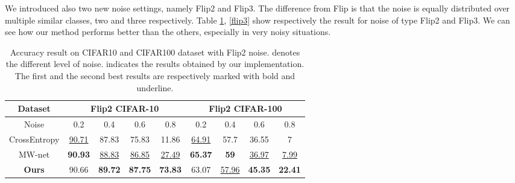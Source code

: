 \documentclass[runningheads]{llncs}
\begin{document}
	We introduced also two new noise settings, namely Flip2 and Flip3. The difference from Flip is that the noise is equally distributed over multiple similar classes, two and three respectively. Table \ref{flip2}, \ref{flip3} show respectively the result for noise of type Flip2 and Flip3. We can see how our method performs better than the others, especially in very noisy situations.
	
	\begin{table}[!ht]
		\caption{\label{flip2} Accuracy result on CIFAR10 and CIFAR100 dataset with Flip2 noise.  denotes the different level of noise.  indicates the results obtained by our implementation. The first and the second best results are respectively marked with bold and underline.}
		\centering
		\begin{tabular}{c|c|c|c|c||c|c|c|c}
			\hline
			Dataset  & \multicolumn{4}{c||}{Flip2 CIFAR-10} & \multicolumn{4}{c}{Flip2 CIFAR-100} \\ \hline
			Noise     & 0.2        & 0.4       & 0.6       & 0.8       & 0.2        & 0.4        & 0.6       & 0.8        \\ \hline
			CrossEntropy  & \underline{90.71}      & 87.83      & 75.83 & 11.86     & \underline{64.91}      & 57.7       & 36.55     & 7 \\
			MW-net \cite{shu2019meta}   & \textbf{90.93}      & \underline{88.83}      & \underline{86.85} & \underline{27.49}     & \textbf{65.37}      & \textbf{59}         & \underline{36.97}    & \underline{7.99}  \\ \hline
			\textbf{Ours}     & 90.66      & \textbf{89.72}      & \textbf{87.75}    & \textbf{73.83}  & 63.07      & \underline{57.96}      & \textbf{45.35}     & \textbf{22.41} \\ \hline
		\end{tabular}
	\end{table}
	
\end{document}
